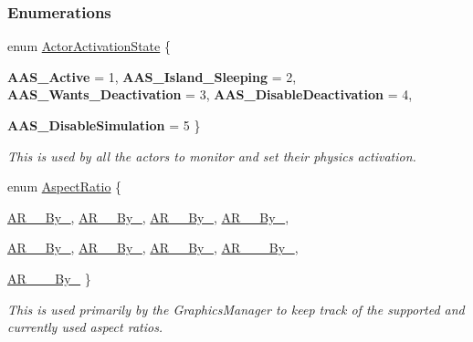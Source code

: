 \subsubsection*{Enumerations}
\begin{DoxyCompactItemize}
\item 
enum \hyperlink{namespacephys_a7d434b1a52cf5290a9ecc972b87a6a40}{ActorActivationState} \{ \par
{\bfseries AAS\_\-Active} =  1, 
{\bfseries AAS\_\-Island\_\-Sleeping} =  2, 
{\bfseries AAS\_\-Wants\_\-Deactivation} =  3, 
{\bfseries AAS\_\-DisableDeactivation} =  4, 
\par
{\bfseries AAS\_\-DisableSimulation} =  5
 \}
\begin{DoxyCompactList}\small\item\em This is used by all the actors to monitor and set their physics activation. \item\end{DoxyCompactList}\item 
enum \hyperlink{namespacephys_aa48055a9624c26d73f77ca67499c7aed}{AspectRatio} \{ \par
\hyperlink{namespacephys_aa48055a9624c26d73f77ca67499c7aeda62f10909139757e92c17b8fbaf82ce6a}{AR\_\_\-By\_}, 
\hyperlink{namespacephys_aa48055a9624c26d73f77ca67499c7aedad2b8f8c1b929fabdf195c2da12a2ec68}{AR\_\_\-By\_}, 
\hyperlink{namespacephys_aa48055a9624c26d73f77ca67499c7aeda432bcb71dfc521ec7cbcf7e40d591ded}{AR\_\_\-By\_}, 
\hyperlink{namespacephys_aa48055a9624c26d73f77ca67499c7aeda75a48f55181fcf03646b7a7bfe3bf0aa}{AR\_\_\-By\_}, 
\par
\hyperlink{namespacephys_aa48055a9624c26d73f77ca67499c7aeda1e17b1da7c1ba4fb6710fa85886fa28a}{AR\_\_\-By\_}, 
\hyperlink{namespacephys_aa48055a9624c26d73f77ca67499c7aedab6449430d220e985cdcf8a9ee8093750}{AR\_\_\-By\_}, 
\hyperlink{namespacephys_aa48055a9624c26d73f77ca67499c7aeda7402aa5b653dbe3ac902bd4c88f28634}{AR\_\_\-By\_}, 
\hyperlink{namespacephys_aa48055a9624c26d73f77ca67499c7aeda5ddf9db3420597cc625cdae1f2c3308a}{AR\_\_\_\-By\_}, 
\par
\hyperlink{namespacephys_aa48055a9624c26d73f77ca67499c7aeda8f306098ebf907f3bede3c99d4ec41b9}{AR\_\_\_\-By\_}
 \}
\begin{DoxyCompactList}\small\item\em This is used primarily by the GraphicsManager to keep track of the supported and currently used aspect ratios. \item\end{DoxyCompactList}\item 

\end{DoxyCompactItemize}
